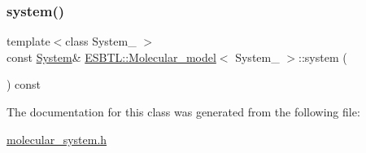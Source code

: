 \mbox{\label{classESBTL_1_1Molecular__model_a7bb52b062e15f25737625b202b7f2f90}} 
\subsubsection{\texorpdfstring{system()}{system()}}
{\footnotesize\ttfamily template$<$class System\+\_\+ $>$ \\
const \hyperlink{classESBTL_1_1Molecular__model_a08cec17302607b3b5f43c94746032996}{System}\& \hyperlink{classESBTL_1_1Molecular__model}{E\+S\+B\+T\+L\+::\+Molecular\+\_\+model}$<$ System\+\_\+ $>$\+::system (\begin{DoxyParamCaption}{ }\end{DoxyParamCaption}) const\hspace{0.3cm}{\ttfamily [inline]}}



The documentation for this class was generated from the following file\+:\begin{DoxyCompactItemize}
\item 
\hyperlink{molecular__system_8h}{molecular\+\_\+system.\+h}\end{DoxyCompactItemize}
